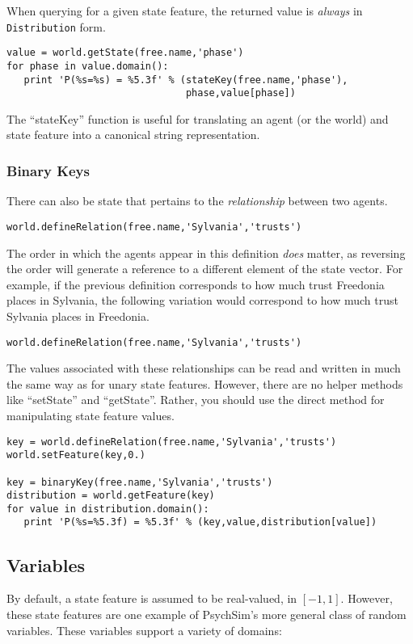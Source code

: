 \documentclass{article}
\begin{document}
When querying for a given state feature, the returned value is {\em always} in {\tt Distribution} form.

\begin{verbatim}
value = world.getState(free.name,'phase')
for phase in value.domain():
   print 'P(%s=%s) = %5.3f' % (stateKey(free.name,'phase'),
                               phase,value[phase])
\end{verbatim}

The ``stateKey'' function is useful for translating an agent (or the world) and state feature into a canonical string representation.

\subsubsection{Binary Keys}
There can also be state that pertains to the {\em relationship} between two agents. 

\begin{verbatim}
world.defineRelation(free.name,'Sylvania','trusts')
\end{verbatim}

The order in which the agents appear in this definition {\em does} matter, as reversing the order will generate a reference to a different element of the state vector. For example, if the previous definition corresponds to how much trust Freedonia places in Sylvania, the following variation  would correspond to how much trust Sylvania places in Freedonia.

\begin{verbatim}
world.defineRelation(free.name,'Sylvania','trusts')
\end{verbatim}

The values associated with these relationships can be read and written in much the same way as for unary state features. However, there are no helper methods like ``setState'' and ``getState''. Rather, you should use the direct method for manipulating state feature values.

\begin{verbatim}
key = world.defineRelation(free.name,'Sylvania','trusts')
world.setFeature(key,0.)

key = binaryKey(free.name,'Sylvania','trusts')
distribution = world.getFeature(key)
for value in distribution.domain():
   print 'P(%s=%5.3f) = %5.3f' % (key,value,distribution[value])
\end{verbatim}

\subsection{Variables}
By default, a state feature is assumed to be real-valued, in $[-1,1]$. However, these state features are one example of PsychSim's more general class of random variables. These variables support a variety of domains:
\end{document}
